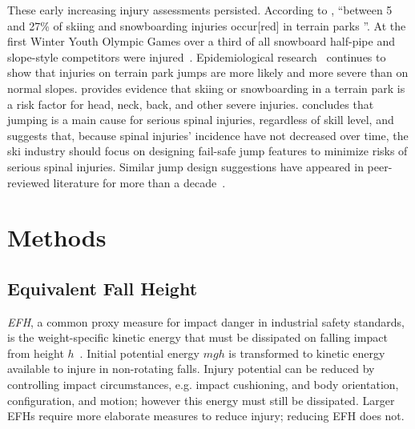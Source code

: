 \documentclass[fleqn,10pt,lineno]{wlpeerj}
\begin{document}
These early increasing injury assessments persisted. According to
\cite{Russell2014}, ``between 5 and 27\% of skiing and snowboarding injuries
occur[red] in terrain parks
\citep{Bridges2003,Goulet2007,Moffat2009,Greve2009,Brooks2010,Ruedl2013}''.  At
the first Winter Youth Olympic Games over a third of all snowboard half-pipe
and slope-style competitors were injured~\citep{Ruedl2012}. Epidemiological
research~\citep{Carus2016,Audet2020,Hosaka2020} continues to show that injuries
on terrain park jumps are more likely and more severe than on normal slopes.
\cite{Audet2020} provides evidence that skiing or snowboarding in a terrain
park is a risk factor for head, neck, back, and other severe injuries.
\cite{Hosaka2020} concludes that jumping is a main cause for serious spinal
injuries, regardless of skill level, and suggests that, because spinal
injuries' incidence  have not decreased over time, the ski industry should
focus on designing fail-safe jump features to minimize risks of serious spinal
injuries. Similar jump design suggestions have appeared in peer-reviewed
literature for more than a
decade~\citep{Hubbard2009,Swedberg2012,Hubbard2012,McNeil2012,McNeil2012a,Hubbard2015,Levy2015,Petrone2017,Moore2018}.

\section*{Methods}
\subsection*{Equivalent Fall Height}
\label{sec:efh}
%
\emph{EFH}, a common proxy measure for impact danger in industrial safety
standards, is the weight-specific kinetic energy that must be dissipated on
falling impact from height $h$~\citep{Muller1995,Hubbard2009,Gasser2018}.
Initial potential energy $mgh$ is transformed to kinetic energy available to
injure in non-rotating falls. Injury potential can be reduced by controlling
impact circumstances, e.g. impact cushioning, and body orientation,
configuration, and motion; however this energy must still be dissipated. Larger
EFHs require more elaborate measures to reduce injury; reducing EFH does not.
\end{document}
